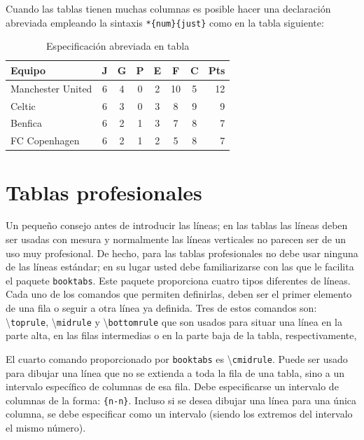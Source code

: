 \documentclass[11pt,a4paper]{article}
\begin{document}
Cuando las tablas tienen muchas columnas es posible hacer una declaración abreviada empleando la sintaxis \texttt{*\{num\}\{just\}} como en la tabla siguiente:

\begin{table}[H]%
	\centering
	\caption{Especificación abreviada en tabla}
	\label{tab:abreviada}
	\begin{tabular}{l*{6}{c}|r}
	Equipo            & J & G & P & E & F  & C & Pts \\
	\hline
	Manchester United & 6 & 4 & 0 & 2 & 10 & 5 & 12  \\
	Celtic            & 6 & 3 & 0 & 3 &  8 & 9 &  9  \\
	Benfica           & 6 & 2 & 1 & 3 &  7 & 8 &  7  \\
	FC Copenhagen     & 6 & 2 & 1 & 2 &  5 & 8 &  7  \\
	\end{tabular}
\end{table}









\section{Tablas profesionales}
Un pequeño consejo antes de introducir las líneas; en las tablas las líneas deben ser usadas con mesura y normalmente las líneas verticales no parecen ser de un uso muy profesional. De hecho, para las tablas profesionales no debe usar ninguna de las líneas estándar; en su lugar usted debe familiarizarse con las que le facilita el paquete \texttt{booktabs}. Este paquete proporciona cuatro tipos diferentes de líneas. Cada uno de los comandos que permiten definirlas, deben ser el primer elemento de una fila o seguir a otra línea ya definida. Tres de estos comandos son: \textbackslash \texttt{toprule}, \textbackslash \texttt{midrule} y \textbackslash \texttt{bottomrule} que son usados para situar una línea en la parte alta, en las filas intermedias o en la parte baja de la tabla, respectivamente, 

El cuarto comando proporcionado por \texttt{booktabs} es \textbackslash \texttt{cmidrule}. Puede ser usado para dibujar una línea que no se extienda a toda la fila de una tabla, sino a un intervalo específico de columnas de esa fila. Debe especificarse un intervalo de columnas de la forma: \texttt{\{n-n\}}. Incluso si se desea dibujar una línea para una única columna, se debe especificar como un intervalo (siendo los extremos del intervalo el mismo número).
\end{document}
